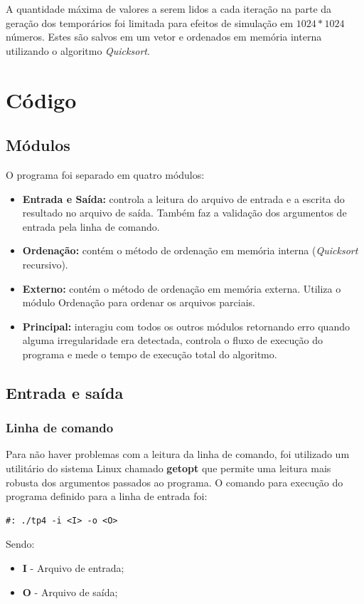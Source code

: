 \documentclass[12pt]{article}
\begin{document}
A quantidade máxima de valores a serem lidos a cada iteração na parte da geração
dos temporários foi limitada para efeitos de simulação em $1024 * 1024$ números.
Estes são salvos em um vetor e ordenados em memória interna utilizando o algoritmo
\textit{Quicksort}.

\section{Código}

\subsection{Módulos}
O programa foi separado em quatro módulos:
\begin{itemize}
\item \textbf{Entrada e Saída:} controla a leitura do arquivo de entrada
e a escrita do resultado no arquivo de saída. Também faz a validação dos 
argumentos de entrada pela linha de comando.
\item \textbf{Ordenação:} contém o método de ordenação em memória interna 
(\textit{Quicksort} recursivo).
\item \textbf{Externo:} contém o método de ordenação em memória externa. Utiliza
o módulo Ordenação para ordenar os arquivos parciais.
\item \textbf{Principal:} interagiu com todos os outros módulos retornando erro
quando alguma irregularidade era detectada, controla o fluxo de execução do
programa e mede o tempo de execução total do algoritmo.
\end{itemize}

\subsection{Entrada e saída}
\subsubsection{Linha de comando}
Para não haver problemas com a leitura da linha de comando, foi utilizado um utilitário do
sistema Linux chamado \textbf{getopt} que permite uma leitura mais robusta dos argumentos
passados ao programa. O comando para execução do programa definido para a linha de entrada 
foi:
\begin{verbatim}
#: ./tp4 -i <I> -o <O>
\end{verbatim}
Sendo: 
\begin{itemize}
  \item \textbf{I} - Arquivo de entrada;
  \item \textbf{O} - Arquivo de saída;
\end{itemize}
\end{document}
